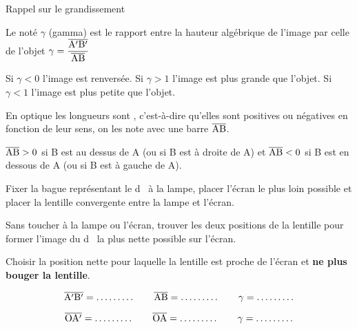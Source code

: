 \begin{doc}{Rappel sur le grandissement}
  \label{doc:grandissement}
  \vspace*{-24pt}
  \begin{encart}
    Le  noté $\gamma$ (gamma) est le rapport entre la hauteur algébrique de l'image par celle de l'objet
    $\gamma = \displaystyle \frac{\overline{\mathrm{A'B'}}}{\overline{\mathrm{AB}}}$
  \end{encart}
  Si $\gamma < 0$ l'image est renversée.
  Si $\gamma > 1$ l'image est plus grande que l'objet. 
  Si $\gamma < 1$ l'image est plus petite que l'objet.
  
  \begin{encart}
    En optique les longueurs sont , c'est-à-dire qu'elles sont positives ou négatives en fonction de leur sens, on les note avec une barre $\overline{\mathrm{AB}}$.
  \end{encart}
  \exemple $\overline{\mathrm{AB}} > 0$ si B est au dessus de A (ou si B est à droite de A) et $\overline{\mathrm{AB}} < 0$ si B est en dessous de A (ou si B est à gauche de A).
\end{doc}
\bigskip


\mesure
Fixer la bague représentant le \og d \fg\, à la lampe, placer l’écran le plus loin possible et placer la lentille convergente entre la lampe et l’écran.

Sans toucher à la lampe ou l'écran, trouver les deux positions de la lentille pour former l’image du \og d \fg\, la plus nette possible sur l’écran.
  
Choisir la position nette pour laquelle la lentille est proche de l’écran et \textbf{ne plus bouger la lentille}.

\vspace*{-8pt}
\begin{equation*}
  \algebrique{A'B'} = \ldots \ldots \ldots
  \qq{}
  \algebrique{AB} = \ldots \ldots \ldots
  \qq{}
  \gamma = \ldots \ldots \ldots
\end{equation*}


\vspace*{-8pt}
\begin{equation*}
  \algebrique{OA'} = \ldots \ldots \ldots
  \qq{}
  \algebrique{OA} = \ldots \ldots \ldots
  \qq{}
  \gamma = \ldots \ldots \ldots
\end{equation*}

